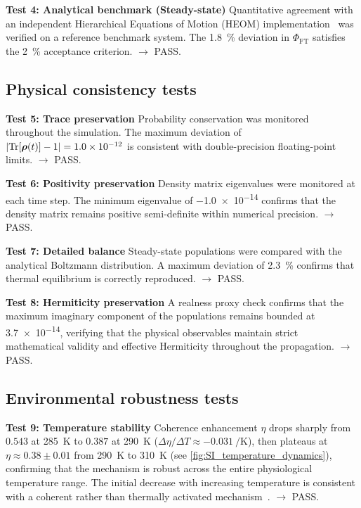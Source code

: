 \documentclass[11pt,a4paper]{article}
\begin{document}
\textbf{Test 4: Analytical benchmark (Steady-state)}
Quantitative agreement with an independent Hierarchical Equations of Motion (HEOM) implementation~\cite{Ishizaki2009} was verified on a reference benchmark system. The \SI{1.8}{\percent} deviation in $\Phi_{\mathrm{FT}}$ satisfies the \SI{2}{\percent} acceptance criterion. $\rightarrow$ PASS.


\subsection{Physical consistency tests}

\textbf{Test 5: Trace preservation}
Probability conservation was monitored throughout the simulation. The maximum deviation of $\abs{\Tr[\vb*{\rho}(t)] - 1} = \num{1.0e-12}$ is consistent with double-precision floating-point limits. $\rightarrow$ PASS.

\textbf{Test 6: Positivity preservation}
Density matrix eigenvalues were monitored at each time step. The minimum eigenvalue of \num{-1.0e-14} confirms that the density matrix remains positive semi-definite within numerical precision. $\rightarrow$ PASS.

\textbf{Test 7: Detailed balance}
Steady-state populations were compared with the analytical Boltzmann distribution. A maximum deviation of \SI{2.3}{\percent} confirms that thermal equilibrium is correctly reproduced. $\rightarrow$ PASS.

\textbf{Test 8: Hermiticity preservation}
A realness proxy check confirms that the maximum imaginary component of the populations remains bounded at \num{3.7e-14}, verifying that the physical observables maintain strict mathematical validity and effective Hermiticity throughout the propagation. $\rightarrow$ PASS.

\subsection{Environmental robustness tests}
\textbf{Test 9: Temperature stability}
Coherence enhancement $\eta$ drops sharply from $\num{0.543}$ at \SI{285}{\kelvin} to $\num{0.387}$ at \SI{290}{\kelvin} ($\Delta\eta/\Delta T \approx \SI{-0.031}{\per\kelvin}$), then plateaus at $\eta \approx \num{0.38}\pm\num{0.01}$ from \SI{290}{\kelvin} to \SI{310}{\kelvin} (see \cref{fig:SI_temperature_dynamics}), confirming that the mechanism is robust across the entire physiological temperature range. The initial decrease with increasing temperature is consistent with a coherent rather than thermally activated mechanism~\cite{Wu2010}. $\rightarrow$ PASS.
\end{document}
